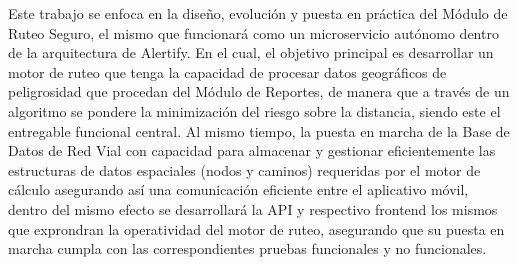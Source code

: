 Este trabajo se enfoca en la diseño, evolución y puesta en práctica del Módulo de Ruteo Seguro, el mismo que funcionará como un microservicio autónomo dentro de la arquitectura de Alertify.
En el cual, el objetivo principal es desarrollar un motor de ruteo que tenga la capacidad de procesar datos geográficos de peligrosidad que procedan del Módulo de Reportes, de manera que a través de un algoritmo se pondere la minimización del riesgo sobre la distancia, siendo este el entregable funcional central. Al mismo tiempo, la puesta en marcha de la Base de Datos de Red Vial con capacidad para almacenar y gestionar eficientemente las estructuras de datos espaciales (nodos y caminos) requeridas por el motor de cálculo asegurando así una comunicación eficiente entre el aplicativo móvil, dentro del mismo efecto se desarrollará la API y respectivo frontend los mismos que exprondran la operatividad del motor de ruteo, asegurando que su puesta en marcha cumpla con las correspondientes pruebas funcionales y no funcionales.





%